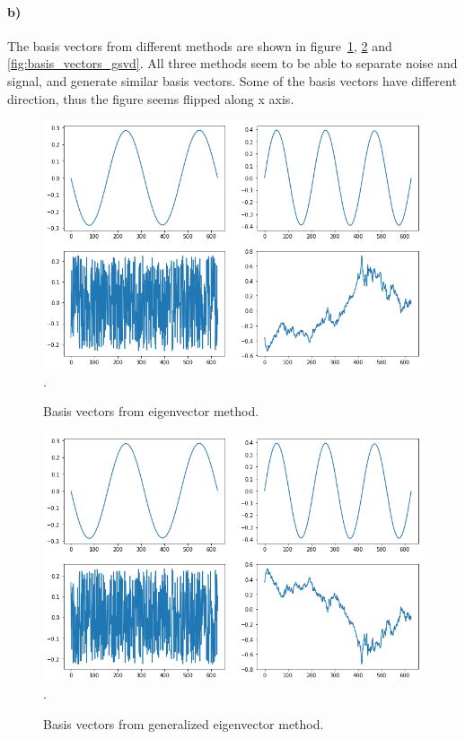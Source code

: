 \documentclass{article}
\begin{document}
\paragraph{b)} The basis vectors from different methods are shown in figure~\ref{fig:basis_vectors_evec}, \ref{fig:basis_vectors_gen_evec} and \ref{fig:basis_vectors_gsvd}. All three methods seem to be able to separate noise and signal, and generate similar basis vectors. Some of the basis vectors have different direction, thus the figure seems flipped along x axis. 
\begin{figure}[h!]
\centering
\includegraphics[width=\linewidth]{../images/2ai.png}.
\caption{Basis vectors from eigenvector method.}
\label{fig:basis_vectors_evec}
\end{figure}
\begin{figure}[h!]
\centering
\includegraphics[width=\linewidth]{../images/2aii.png}.
\caption{Basis vectors from generalized eigenvector method.}
\label{fig:basis_vectors_gen_evec}
\end{figure}
\end{document}
